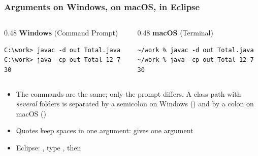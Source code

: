 \documentclass[aspectratio=169,10pt,compress]{beamer}
\begin{document}
\begin{frame}[t,fragile] \frametitle{Arguments on Windows, on macOS, in Eclipse}
	\begin{columns}[T]
		\begin{column}{0.48\textwidth}
			\textbf{Windows} (Command Prompt) 


\begin{lstlisting}[style=codesnippet, language={}]
C:\work> javac -d out Total.java
C:\work> java -cp out Total 12 7 30
\end{lstlisting}


		\end{column}
		\begin{column}{0.48\textwidth}
			\textbf{macOS} (Terminal) 


\begin{lstlisting}[style=codesnippet, language={}]
~/work % javac -d out Total.java
~/work % java -cp out Total 12 7 30
\end{lstlisting}


		\end{column}
	\end{columns}

	\vspace{0.3em}
	\begin{itemize}\small
		\item The commands are the same; only the prompt differs. A class path with
		      \emph{several} folders is separated by a semicolon on Windows () and by a colon on macOS ()
		\item Quotes keep spaces in one argument:  gives one argument
		\item Eclipse: ,
		      type , then 
	\end{itemize}
\end{frame}




\end{document}
